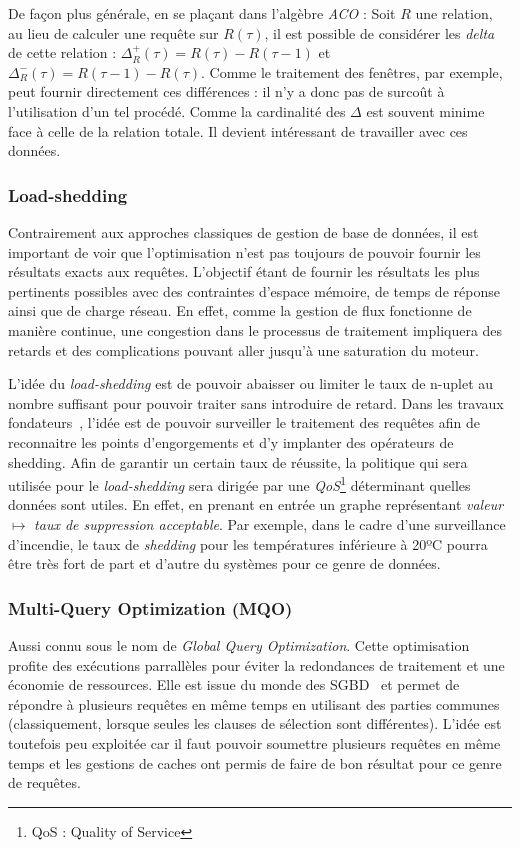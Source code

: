 De façon plus générale, en se plaçant dans l'algèbre \textit{ACO} : Soit $R$ une relation, au lieu de calculer une requête sur $R(\tau)$, il est possible de considérer les \textit{delta} de cette relation : $\Delta_R^+(\tau) = R(\tau)-R(\tau-1)$ et $\Delta_R^-(\tau) = R(\tau-1)-R(\tau)$. Comme le traitement des fenêtres, par exemple, peut fournir directement ces différences : il n'y a donc pas de surcoût à l'utilisation d'un tel procédé. Comme la cardinalité des $\Delta$ est souvent minime face à celle de la relation totale. Il devient intéressant de travailler avec ces données.
\subsubsection{Load-shedding}
Contrairement aux approches classiques de gestion de base de données, il est important de voir que l'optimisation n'est pas toujours de pouvoir fournir les résultats exacts aux requêtes. L'objectif étant de fournir les résultats les plus pertinents possibles avec des contraintes d'espace mémoire, de temps de réponse ainsi que de charge réseau. En effet, comme la gestion de flux fonctionne de manière continue, une congestion dans le processus de traitement impliquera des retards et des complications pouvant aller jusqu'à une saturation du moteur.

L'idée du \textit{load-shedding} est de pouvoir abaisser ou limiter le taux de n-uplet au nombre suffisant pour pouvoir traiter sans introduire de retard. Dans les travaux fondateurs~\cite{Tatbul:window,Tatbul:load-shedding}, l'idée est de pouvoir surveiller le traitement des requêtes afin de reconnaitre les points d'engorgements et d'y implanter des opérateurs de shedding. Afin de garantir un certain taux de réussite, la politique qui sera utilisée pour le \textit{load-shedding} sera dirigée par une \textit{QoS}\footnote{QoS : Quality of Service} déterminant quelles données sont utiles. En effet, en prenant en entrée un graphe représentant \textit{valeur} $\mapsto$  \textit{taux de suppression acceptable}. Par exemple, dans le cadre d'une surveillance d'incendie, le taux de \textit{shedding} pour les températures inférieure à 20ºC pourra être très fort de part et d'autre du systèmes pour ce genre de données.


\subsubsection{Multi-Query Optimization (MQO)}
Aussi connu sous le nom de \textit{Global Query Optimization}. Cette optimisation profite des exécutions parrallèles pour éviter la redondances de traitement et une économie de ressources. Elle est issue du monde des SGBD~\cite{Sellis:mqo} et permet de répondre à plusieurs requêtes en même temps en utilisant des parties communes (classiquement, lorsque seules les clauses de sélection sont différentes). L'idée est toutefois peu exploitée car il faut pouvoir soumettre plusieurs requêtes en même temps et les gestions de caches ont permis de faire de bon résultat pour ce genre de requêtes. 

